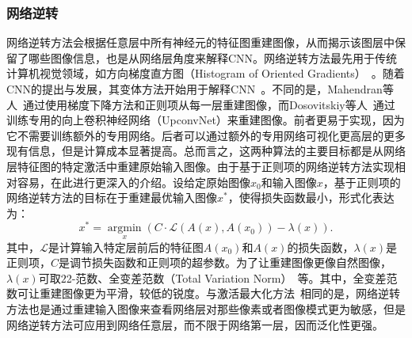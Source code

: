 \subsubsection{网络逆转}
网络逆转方法会根据任意层中所有神经元的特征图重建图像，从而揭示该图层中保留了哪些图像信息，也是从网络层角度来解释CNN。网络逆转方法最先用于传统计算机视觉领域，如方向梯度直方图（Histogram of Oriented Gradients）~\cite{dalal2005histograms}。随着CNN的提出与发展，其变体方法开始用于解释CNN~\cite{mahendran2015understanding, mahendran2016visualizing, dosovitskiy2016inverting}。不同的是，Mahendran等人~\cite{mahendran2015understanding, mahendran2016visualizing}通过使用梯度下降方法和正则项从每一层重建图像，而Dosovitskiy等人~\cite{dosovitskiy2016inverting}通过训练专用的向上卷积神经网络（UpconvNet）来重建图像。前者更易于实现，因为它不需要训练额外的专用网络。后者可以通过额外的专用网络可视化更高层的更多现有信息，但是计算成本显著提高。总而言之，这两种算法的主要目标都是从网络层特征图的特定激活中重建原始输入图像。由于基于正则项的网络逆转方法实现相对容易，在此进行更深入的介绍。设给定原始图像$x_0$和输入图像$x$，基于正则项的网络逆转方法的目标在于重建最优输入图像$x^*$，使得损失函数最小，形式化表达为：
\begin{equation*}
x^{*}=\underset{x}{\operatorname{argmin}}\left(C \cdot \mathcal{L}\left(A(x), A\left(x_{0}\right)\right)-\lambda(x)\right).
\end{equation*}
其中，$\mathcal{L}$是计算输入特定层前后的特征图$A(x_0)$和$A(x)$的损失函数，$\lambda(x)$是正则项，$C$是调节损失函数和正则项的超参数。为了让重建图像更像自然图像，$\lambda(x)$可取$2$2-范数、全变差范数（Total Variation Norm）~\cite{rudin1992nonlinear}等。其中，全变差范数可让重建图像更为平滑，较低的锐度。与激活最大化方法~\cite{simonyan2013deep}相同的是，网络逆转方法也是通过重建输入图像来查看网络层对那些像素或者图像模式更为敏感，但是网络逆转方法可应用到网络任意层，而不限于网络第一层，因而泛化性更强。
